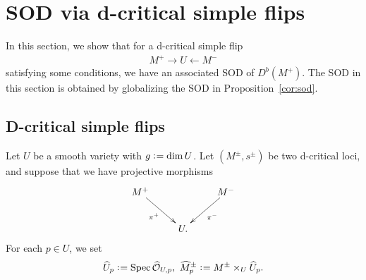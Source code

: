 \documentclass[11pt]{amsart}
\theoremstyle{plain}
\newcommand{\oO}{\mathcal{O}}
\newcommand{\Spec}{\mathop{\rm Spec}\nolimits}
\begin{document}
\section{SOD via d-critical simple flips}\label{sec:dcrit}
In this section, we show that for 
a d-critical simple flip
\begin{align*}
M^+ \to U \leftarrow M^-
\end{align*}
satisfying 
some conditions, 
we have an associated SOD of $D^b(M^+)$.
The SOD in this section is 
obtained by globalizing the 
SOD in Proposition~\ref{cor:sod}. 
\subsection{D-critical simple flips}\label{subsec:mainthm}
Let $U$ be a smooth variety with 
$g \cneq \dim U$. 
Let $(M^{\pm}, s^{\pm})$ be two 
d-critical loci, 
and suppose that we have projective morphisms 
\begin{align}\label{dia:pi}
\xymatrix{
M^+ \ar[rd]_-{\pi^+} & & M^- \ar[ld]^-{\pi^-} \\
& U. &
}
\end{align}
For each $p \in U$, we set
\begin{align}\label{complete:p}
\widehat{U}_p \cneq \Spec \widehat{\oO}_{U, p}, \ 
\widehat{M}_p^{\pm} \cneq M^{\pm} \times_U \widehat{U}_p.
\end{align}
\end{document}
